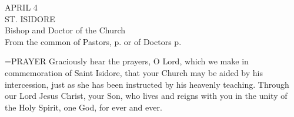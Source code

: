 \begin{center}\normalsize APRIL 4\\
\footnotesize ST. ISIDORE\\
\footnotesize Bishop and Doctor of the Church\\
\footnotesize From the common of Pastors, p.    or of Doctors p. \\
\end{center}

\hangindent=\parindent \small{PRAYER 
Graciously hear the prayers, O Lord,
which we make in commemoration of Saint Isidore,
that your Church may be aided by his intercession,
just as she has been instructed by his heavenly teaching.
Through our Lord Jesus Christ, your Son,
who lives and reigns with you in the unity of the Holy Spirit,
one God, for ever and ever.\\}
 
